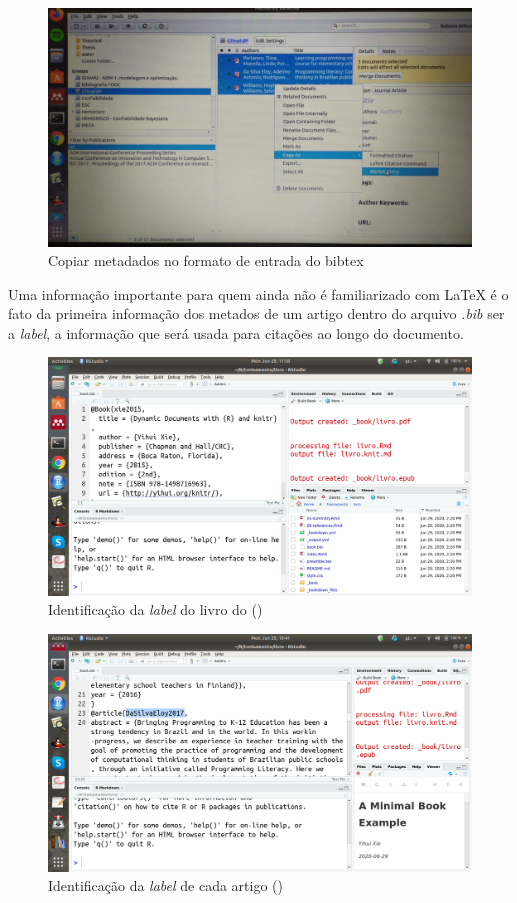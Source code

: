 \documentclass[
]{book}
\begin{document}
\begin{figure}
\centering
\includegraphics{fig/mendeley_copy_bibtex_entry.jpeg}
\caption{Copiar metadados no formato de entrada do bibtex}
\end{figure}

Uma informação importante para quem ainda não
é familiarizado com LaTeX é o fato
da primeira informação dos metados
de um artigo dentro do arquivo \emph{.bib}
ser a \emph{label}, a informação que será
usada para citações ao longo do documento.

\begin{figure}
\centering
\includegraphics{fig/rstudio_open_bookbib_first.png}
\caption{Identificação da \emph{label} do livro do (\citep{xie2015})}
\end{figure}

\begin{figure}
\centering
\includegraphics{fig/rstudio_open_bookbib_second.png}
\caption{Identificação da \emph{label} de cada artigo (\citep{DaSilvaEloy2017})}
\end{figure}
\end{document}
